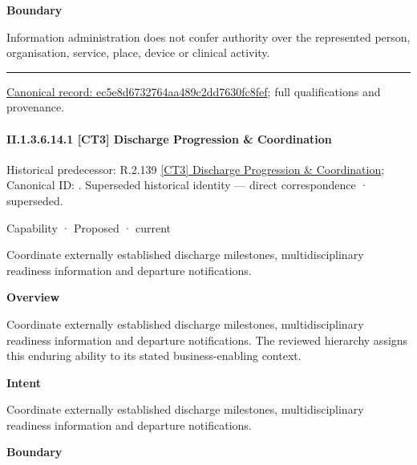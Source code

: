 \textbf{Boundary}



Information administration does not confer authority over the represented person, organisation, service, place, device or clinical activity.



\medskip\hrule\medskip

{\footnotesize \href{../../../../../../../continuum/strategy/capability/ec5e8d6732764aa489c2dd7630fc8fef.md}{Canonical record: ec5e8d6732764aa489c2dd7630fc8fef}; full qualifications and provenance.}\par
\paragraph*{II.1.3.6.14.1 [CT3] Discharge Progression \& Coordination}
\label{navigation:II.1.3.6.14.1}

{\small Historical predecessor: R.2.139 \hyperref[element:68344272ca6049648a3ddae20c150f37]{[CT3] Discharge Progression \& Coordination}; Canonical ID: \texttt{}. Superseded historical identity — direct correspondence · superseded.}\par
\label{element:d6048993146b45639bab27860f94f34f}
{\small Capability · Proposed · current}\par

Coordinate externally established discharge milestones, multidisciplinary readiness information and departure notifications.



\textbf{Overview}



Coordinate externally established discharge milestones, multidisciplinary readiness information and departure notifications. The reviewed hierarchy assigns this enduring ability to its stated business-enabling context.



\textbf{Intent}



Coordinate externally established discharge milestones, multidisciplinary readiness information and departure notifications.



\textbf{Boundary}



